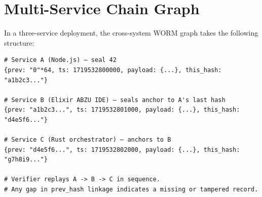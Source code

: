 \documentclass[12pt,letterpaper]{article}
\begin{document}
\section{Multi-Service Chain Graph}
\label{app:graph}

In a three-service deployment, the cross-system WORM graph takes the following
structure:

\begin{lstlisting}[caption={Cross-system chain anchoring}]
# Service A (Node.js) — seal 42
{prev: "0"*64, ts: 1719532800000, payload: {...}, this_hash: "a1b2c3..."}

# Service B (Elixir ABZU IDE) — seals anchor to A's last hash
{prev: "a1b2c3...", ts: 1719532801000, payload: {...}, this_hash: "d4e5f6..."}

# Service C (Rust orchestrator) — anchors to B
{prev: "d4e5f6...", ts: 1719532802000, payload: {...}, this_hash: "g7h8i9..."}

# Verifier replays A -> B -> C in sequence.
# Any gap in prev_hash linkage indicates a missing or tampered record.
\end{lstlisting}
\end{document}
